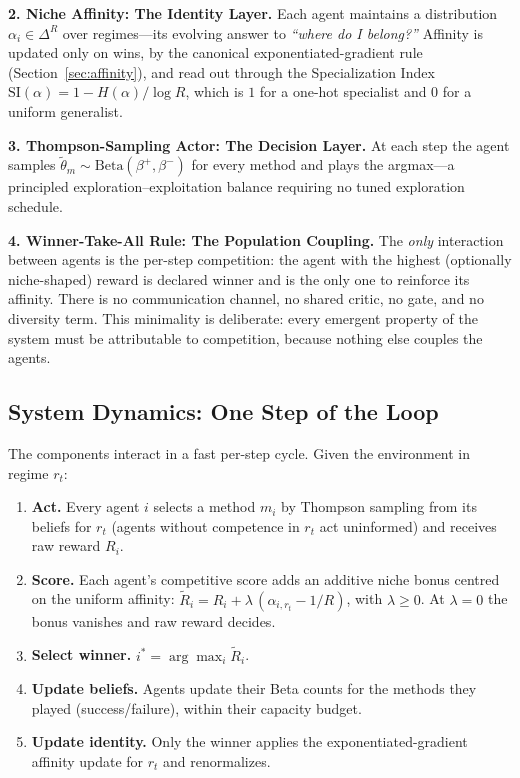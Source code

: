 \documentclass[11pt]{article}
\newcommand{\SI}{\mathrm{SI}}
\begin{document}
\textbf{2. Niche Affinity: The Identity Layer.} Each agent maintains a
distribution $\alpha_i \in \Delta^R$ over regimes---its evolving answer to
\emph{``where do I belong?''} Affinity is updated only on wins, by the canonical
exponentiated-gradient rule (Section~\ref{sec:affinity}), and read out through
the Specialization Index $\SI(\alpha) = 1 - H(\alpha)/\log R$, which is $1$ for
a one-hot specialist and $0$ for a uniform generalist.

\textbf{3. Thompson-Sampling Actor: The Decision Layer.} At each step the agent
samples $\tilde{\theta}_m \sim \mathrm{Beta}(\beta^{+},\beta^{-})$ for every
method and plays the argmax---a principled exploration--exploitation balance
requiring no tuned exploration schedule.

\textbf{4. Winner-Take-All Rule: The Population Coupling.} The \emph{only}
interaction between agents is the per-step competition: the agent with the
highest (optionally niche-shaped) reward is declared winner and is the only one
to reinforce its affinity. There is no communication channel, no shared critic,
no gate, and no diversity term. This minimality is deliberate: every emergent
property of the system must be attributable to competition, because nothing else
couples the agents.

\subsection{System Dynamics: One Step of the Loop}

The components interact in a fast per-step cycle. Given the environment in
regime $r_t$:

\begin{enumerate}[itemsep=2pt]
    \item \textbf{Act.} Every agent $i$ selects a method $m_i$ by Thompson
    sampling from its beliefs for $r_t$ (agents without competence in $r_t$ act
    uninformed) and receives raw reward $R_i$.
    \item \textbf{Score.} Each agent's competitive score adds an additive niche
    bonus centred on the uniform affinity:
    $\tilde{R}_i = R_i + \lambda\,(\alpha_{i,r_t} - 1/R)$, with $\lambda \ge 0$.
    At $\lambda = 0$ the bonus vanishes and raw reward decides.
    \item \textbf{Select winner.} $i^* = \arg\max_i \tilde{R}_i$.
    \item \textbf{Update beliefs.} Agents update their Beta counts for the
    methods they played (success/failure), within their capacity budget.
    \item \textbf{Update identity.} Only the winner applies the
    exponentiated-gradient affinity update for $r_t$ and renormalizes.
\end{enumerate}
\end{document}
